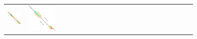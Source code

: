 \begin{figure}[t]
\begin{tabular}{l>{\centering}m{0.18\linewidth}>{\centering}m{0.18\linewidth}>{\centering}m{0.18\linewidth}>{\centering\arraybackslash}m{0.35\linewidth}}
    \includegraphics[scale=0.15]{imgs/comparison/csh.png} &
    \includegraphics[scale=0.15]{imgs/comparison/csh-noprune-dt.png} &

\end{tabular}
\end{figure}
